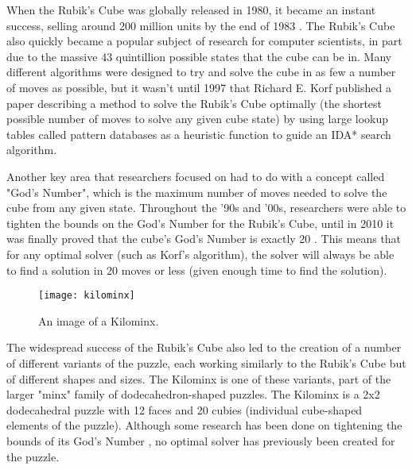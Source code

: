 When the Rubik's Cube was globally released in 1980, it became an instant success, selling around 200 million units by the end of 1983 \cite{unitssold}. The Rubik's Cube also quickly became a popular subject of research for computer scientists, in part due to the massive 43 quintillion possible states \cite{states} that the cube can be in. Many different algorithms were designed to try and solve the cube in as few a number of moves as possible, but it wasn't until 1997 that Richard E. Korf published a paper \cite{korf} describing a method to solve the Rubik's Cube optimally (the shortest possible number of moves to solve any given cube state) by using large lookup tables called pattern databases \cite{patterndatabases} as a heuristic function to guide an IDA* search algorithm. 

Another key area that researchers focused on had to do with a concept called "God's Number", which is the maximum number of moves needed to solve the cube from any given state. Throughout the '90s and '00s, researchers were able to tighten the bounds on the God's Number for the Rubik's Cube, until in 2010 it was finally proved that the cube's God's Number is exactly 20 \cite{godsnumber}. This means that for any optimal solver (such as Korf's algorithm), the solver will always be able to find a solution in 20 moves or less (given enough time to find the solution).

\begin{figure}[h]
    \texttt{[image: kilominx]}
    \centering
    \caption[An image of a Kilominx.]{An image of a Kilominx\footnotemark.}
\end{figure}


The widespread success of the Rubik's Cube also led to the creation of a number of different variants of the puzzle, each working similarly to the Rubik's Cube but of different shapes and sizes. The Kilominx is one of these variants, part of the larger "minx" family of dodecahedron-shaped puzzles. The Kilominx is a 2x2 dodecahedral puzzle with 12 faces and 20 cubies (individual cube-shaped elements of the puzzle). Although some research has been done on tightening the bounds of its God's Number \cite{kilominxgodsnumber}, no optimal solver has previously been created for the puzzle.

